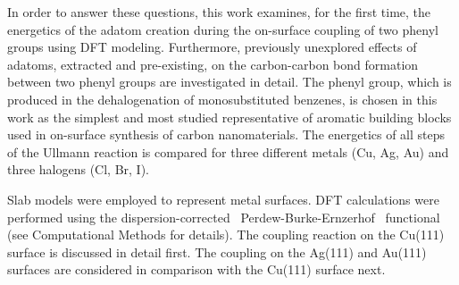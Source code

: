\documentclass[aps,prb,amsmath,amssymb,11pt]{revtex4-1}
\newcommand*{\ACSNANO}{}
\begin{document}
In order to answer these questions, this work examines, for the first time, the energetics of the adatom creation during the on-surface coupling of two phenyl groups using DFT modeling. 
Furthermore, previously unexplored effects of adatoms, extracted and pre-existing, on the carbon-carbon bond formation between two phenyl groups are investigated in detail. 
The phenyl group, which is produced in the dehalogenation of monosubstituted benzenes, is chosen in this work as the simplest and most studied representative of aromatic building blocks used in on-surface synthesis of carbon nanomaterials. The energetics of all steps of the Ullmann reaction is compared for three different metals (Cu, Ag, Au) and three halogens (Cl, Br, I).

\ifdefined\ACSNANO
\else

\fi



\ifdefined\ACSNANO

Slab models were employed to represent metal surfaces. DFT calculations were performed using the dispersion-corrected~\cite{ullmann_136, ullmann_137} Perdew-Burke-Ernzerhof~\cite{ullmann_139} functional (see Computational Methods for details).
%
\fi
%
The coupling reaction on the Cu(111) surface is discussed in detail first. The coupling on the Ag(111) and Au(111) surfaces are considered in comparison with the Cu(111) surface next.
\end{document}
